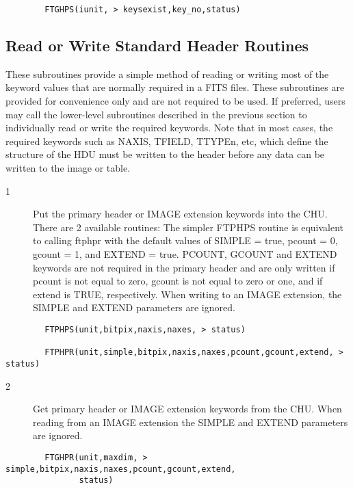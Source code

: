 \documentclass[11pt]{book}
\begin{document}
\begin{verbatim}
        FTGHPS(iunit, > keysexist,key_no,status)
\end{verbatim}

\subsection{Read or Write Standard Header Routines \label{FTPHPR}}

These subroutines provide a simple method of reading or writing most of
the keyword values that are normally required in a FITS files.  These
subroutines are provided for convenience only and are not required to
be used.  If preferred, users may call the lower-level subroutines
described in the previous section to individually read or write the
required keywords.  Note that in most cases, the required keywords such
as NAXIS, TFIELD, TTYPEn, etc, which define the structure of the HDU
must be written to the header before any data can be written to the
image or table.


\begin{description}
\item[1 ] Put the primary header or IMAGE extension keywords into the CHU.
There are 2 available routines: The simpler FTPHPS routine is
equivalent to calling ftphpr with the default values of SIMPLE = true,
pcount = 0, gcount = 1, and EXTEND = true.  PCOUNT, GCOUNT and EXTEND
keywords are not required in the primary header and are only written if
pcount is not equal to zero, gcount is not equal to zero or one, and if
extend is TRUE, respectively.  When writing to an IMAGE extension, the
SIMPLE and EXTEND parameters are ignored.
\end{description}

\begin{verbatim}
        FTPHPS(unit,bitpix,naxis,naxes, > status)

        FTPHPR(unit,simple,bitpix,naxis,naxes,pcount,gcount,extend, > status)
\end{verbatim}

\begin{description}
\item[2 ] Get primary header or IMAGE extension keywords from the CHU.  When
    reading from an IMAGE extension the SIMPLE and EXTEND parameters are
   ignored.
\end{description}

\begin{verbatim}
        FTGHPR(unit,maxdim, > simple,bitpix,naxis,naxes,pcount,gcount,extend,
               status)
\end{verbatim}
\end{document}
